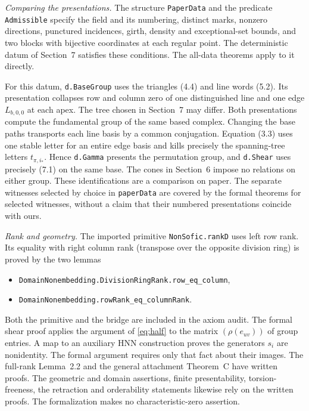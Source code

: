 \documentclass[11pt,a4paper]{article}
\numberwithin{equation}{section}
\begin{document}
\noindent\textit{Comparing the presentations.}
The structure \texttt{PaperData} and the predicate \texttt{Admissible}
specify the field and its numbering, distinct marks, nonzero directions,
punctured incidences, girth, density and exceptional-set bounds, and two
blocks with bijective coordinates at each regular point. The deterministic
datum of Section~7 satisfies these conditions. The all-data theorems apply
to it directly.

For this datum, \texttt{d.BaseGroup} uses the triangles (4.4) and line
words (5.2). Its presentation collapses row and column zero of one
distinguished line and one edge $L_{b,0,0}$ at each apex. The tree chosen
in Section~7 may differ. Both presentations compute the fundamental group
of the same based complex. Changing the base paths transports each line
basis by a common conjugation. Equation (3.3) uses one stable letter for an
entire edge basis and kills precisely the spanning-tree letters $t_{\pi,i_*}$.
Hence \texttt{d.Gamma} presents the permutation group, and \texttt{d.Shear}
uses precisely (7.1) on the same base. The cones in Section~6 impose no
relations on either group. These identifications are a comparison on paper.
The separate witnesses selected by choice in \texttt{paperData} are covered
by the formal theorems for selected witnesses, without a claim that their
numbered presentations coincide with ours.

\medskip
\noindent\textit{Rank and geometry.}
The imported primitive \texttt{NonSofic.rankD} uses left row rank. Its
equality with right column rank (transpose over the opposite division ring)
is proved by the two lemmas
\begin{itemize}
\item \nolinkurl{DomainNonembedding.DivisionRingRank.row_eq_column},
\item \nolinkurl{DomainNonembedding.rowRank_eq_columnRank}.
\end{itemize}
Both the primitive and the bridge are included in the axiom audit. The
formal shear proof applies the argument of \eqref{eq:half} to the matrix
$(\rho(e_{uv}))$ of group entries. A map to an auxiliary HNN construction proves the
generators $s_i$ are nonidentity. The formal argument requires only that
fact about their images. The full-rank Lemma~2.2 and the general attachment
Theorem~C have written proofs. The geometric and domain assertions, finite
presentability, torsion-freeness, the retraction and orderability statements
likewise rely on the written proofs. The formalization makes no
characteristic-zero assertion.
\end{document}
